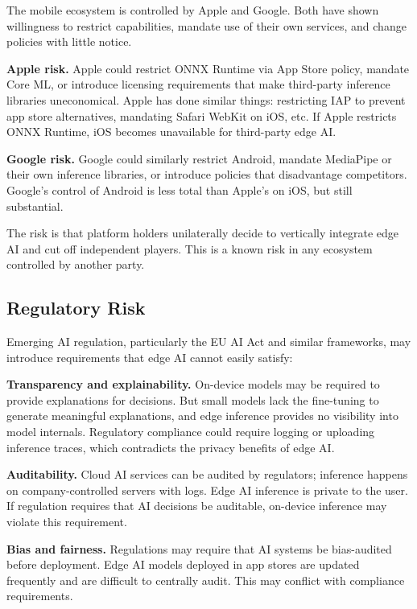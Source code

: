 \documentclass[12pt, letterpaper, twoside]{report}
\begin{document}
The mobile ecosystem is controlled by Apple and Google. Both have shown willingness to restrict capabilities, mandate use of their own services, and change policies with little notice.

\textbf{Apple risk.} Apple could restrict ONNX Runtime via App Store policy, mandate Core ML, or introduce licensing requirements that make third-party inference libraries uneconomical. Apple has done similar things: restricting IAP to prevent app store alternatives, mandating Safari WebKit on iOS, etc. If Apple restricts ONNX Runtime, iOS becomes unavailable for third-party edge AI.

\textbf{Google risk.} Google could similarly restrict Android, mandate MediaPipe or their own inference libraries, or introduce policies that disadvantage competitors. Google's control of Android is less total than Apple's on iOS, but still substantial.

The risk is that platform holders unilaterally decide to vertically integrate edge AI and cut off independent players. This is a known risk in any ecosystem controlled by another party.

\subsection{Regulatory Risk}
\label{subsec:regulatory_risk}

Emerging AI regulation, particularly the EU AI Act and similar frameworks, may introduce requirements that edge AI cannot easily satisfy:

\textbf{Transparency and explainability.} On-device models may be required to provide explanations for decisions. But small models lack the fine-tuning to generate meaningful explanations, and edge inference provides no visibility into model internals. Regulatory compliance could require logging or uploading inference traces, which contradicts the privacy benefits of edge AI.

\textbf{Auditability.} Cloud AI services can be audited by regulators; inference happens on company-controlled servers with logs. Edge AI inference is private to the user. If regulation requires that AI decisions be auditable, on-device inference may violate this requirement.

\textbf{Bias and fairness.} Regulations may require that AI systems be bias-audited before deployment. Edge AI models deployed in app stores are updated frequently and are difficult to centrally audit. This may conflict with compliance requirements.
\end{document}
